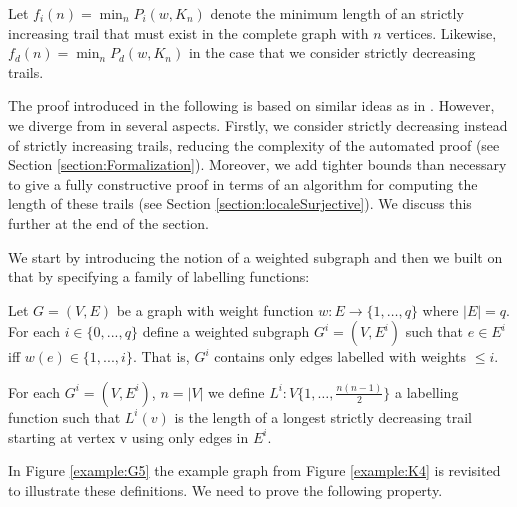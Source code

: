 \begin{isabellebody}
\begin{isamarkuptext}
Let $f_i(n) = \min_n P_i(w,K_n)$ denote the minimum length of an strictly increasing trail that must exist in 
the complete graph with $n$ vertices. Likewise, $f_d(n) = \min_n P_d(w,K_n)$ in the case that we consider 
strictly decreasing trails.%
\end{isamarkuptext}\isamarkuptrue%
%
\isadelimdocument
%
\endisadelimdocument
%
\isatagdocument
%
\isamarkuptrue%
%
\endisatagdocument
{\isafolddocument}%
%
\isadelimdocument
%
\endisadelimdocument
%
\begin{isamarkuptext}%
\label{section:symbolicProof}
The proof introduced in the following is based on similar ideas as in \cite{graham1973increasing}. 
However, we diverge from \cite{graham1973increasing} in several aspects. Firstly, we consider strictly decreasing instead of strictly increasing trails,
reducing the complexity of the automated proof (see Section \ref{section:Formalization}). 
Moreover, we add tighter bounds than necessary to give a fully constructive proof in terms of an algorithm for computing
the length of these trails (see Section \ref{section:localeSurjective}). We discuss this further at the end of the section.

We start by introducing the notion of a weighted subgraph and then we built on that by specifying a family of labelling functions:

\begin{definition} \label{def:weightedSubgraph}
	Let $G=(V,E)$ be a graph with weight function $w:E\rightarrow \{1,\ldots,q\}$ where $|E| = q$.
	For each $i\in \{0,...,q\}$ define a weighted subgraph $G^i = (V,E^i)$ such that $e\in E^i$ iff $w(e)\in \{1,...,i\}$. 
  That is, $G^i$ contains only edges labelled with weights $\le i$.
\end{definition}

\begin{definition}\label{def:Labelling}
	For each $G^i=(V,E^i)$, $n = |V|$  we define $L^i:V \{1,\ldots,\frac{n(n-1)}{2}\}$ a labelling function such 
that $L^i(v)$ is the length of a longest strictly decreasing trail starting at vertex v using only edges in $E^i$.
\end{definition}

\noindent In Figure \ref{example:G5} the example graph from Figure \ref{example:K4} is revisited to 
illustrate these definitions. We need to prove the following property.

\begin{figure}
\centering


\end{figure}
\end{isamarkuptext}
\end{isabellebody}
